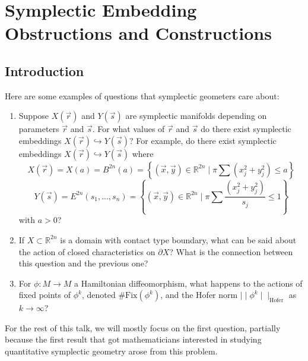 \chapter{Symplectic Embedding Obstructions and Constructions}
\label{u1}

\section{Introduction}

Here are some examples of questions that symplectic geometers care about:
\begin{enumerate}
\item Suppose $X(\vec{r})$ and $Y(\vec{s})$ are symplectic manifolds depending on parameters $\vec{r}$ and $\vec{s}$. For what values of $\vec{r}$ and $\vec{s}$ do there exist symplectic embeddings $X(\vec{r})\hookrightarrow Y(\vec{s})$?  For example, do there exist symplectic embeddings $X(\vec{r})\hookrightarrow Y(\vec{s})$ where
\[
    X(\vec{r}) = X(a)=B^{2n}(a)=\left\{ (\vec{x}, \vec{y})\in \mathbb{R}^{2n} \mid  \pi \sum(x_j^2+y_j^2) \le a \right\}
\]
\[
    Y(\vec{s}) = E^{2n}(s_1,...,s_n) = \left\{ (\vec{x}, \vec{y}) \in \mathbb{R}^{2n} \mid  \pi \sum \dfrac{(x_j^2+y_j^2)}{s_j}\le 1 \right\}
\]
with $a>0$?
\item If $X\subset \mathbb{R}^{2n}$ is a domain with contact type boundary, what can be said about the action of closed characteristics on $\partial X$? What is the connection between this question and the previous one?
\item For $\phi: M\to M$ a Hamiltonian diffeomorphism, what happens to the actions of fixed points of $\phi^k$, denoted $\# \text{Fix}\left(\phi^k\right)$, and the Hofer norm $\mid \mid \phi^k\mid \mid_{\text{Hofer}}$ as $k\to \infty$?
\end{enumerate}

For the rest of this talk, we will mostly focus on the first question, partially because the first result that got mathematicians interested in studying quantitative symplectic geometry arose from this problem.

